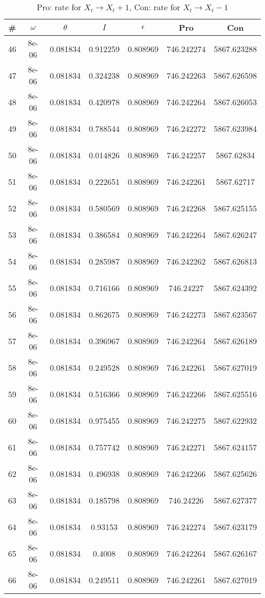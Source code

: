\newpage
\begin{table}
\caption{Pro: rate for $X_t \rightarrow X_t + 1$, Con: rate for $X_t \rightarrow X_t - 1$}
\begin{tabular*}{\linewidth}{c|c|c|c|c|c|c}
\# & $\omega$ & $\theta$ & $I$ & $\epsilon$ & Pro & Con \\
\hline
46 & 8e-06 & 0.081834 & 0.912259 & 0.808969 & 746.242274 & 5867.623288\\
47 & 8e-06 & 0.081834 & 0.324238 & 0.808969 & 746.242263 & 5867.626598\\
48 & 8e-06 & 0.081834 & 0.420978 & 0.808969 & 746.242264 & 5867.626053\\
49 & 8e-06 & 0.081834 & 0.788544 & 0.808969 & 746.242272 & 5867.623984\\
50 & 8e-06 & 0.081834 & 0.014826 & 0.808969 & 746.242257 & 5867.62834\\
51 & 8e-06 & 0.081834 & 0.222651 & 0.808969 & 746.242261 & 5867.62717\\
52 & 8e-06 & 0.081834 & 0.580569 & 0.808969 & 746.242268 & 5867.625155\\
53 & 8e-06 & 0.081834 & 0.386584 & 0.808969 & 746.242264 & 5867.626247\\
54 & 8e-06 & 0.081834 & 0.285987 & 0.808969 & 746.242262 & 5867.626813\\
55 & 8e-06 & 0.081834 & 0.716166 & 0.808969 & 746.24227 & 5867.624392\\
56 & 8e-06 & 0.081834 & 0.862675 & 0.808969 & 746.242273 & 5867.623567\\
57 & 8e-06 & 0.081834 & 0.396967 & 0.808969 & 746.242264 & 5867.626189\\
58 & 8e-06 & 0.081834 & 0.249528 & 0.808969 & 746.242261 & 5867.627019\\
59 & 8e-06 & 0.081834 & 0.516366 & 0.808969 & 746.242266 & 5867.625516\\
60 & 8e-06 & 0.081834 & 0.975455 & 0.808969 & 746.242275 & 5867.622932\\
61 & 8e-06 & 0.081834 & 0.757742 & 0.808969 & 746.242271 & 5867.624157\\
62 & 8e-06 & 0.081834 & 0.496938 & 0.808969 & 746.242266 & 5867.625626\\
63 & 8e-06 & 0.081834 & 0.185798 & 0.808969 & 746.24226 & 5867.627377\\
64 & 8e-06 & 0.081834 & 0.93153 & 0.808969 & 746.242274 & 5867.623179\\
65 & 8e-06 & 0.081834 & 0.4008 & 0.808969 & 746.242264 & 5867.626167\\
66 & 8e-06 & 0.081834 & 0.249511 & 0.808969 & 746.242261 & 5867.627019\\

\end{tabular*}
\end{table}
